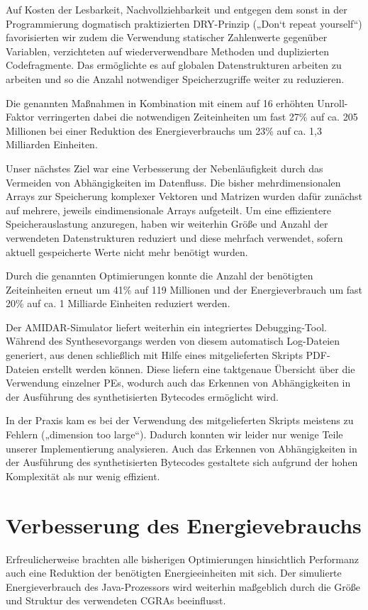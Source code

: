 \documentclass[parskip,
							 oneside,
							 11pt,
							 noheadingspace,
							 accentcolor=tud1d,
							 bigchapter,
							 colorback]{tudreport}
\begin{document}
Auf Kosten der Lesbarkeit, Nachvollziehbarkeit und entgegen dem sonst in der Programmierung dogmatisch praktizierten DRY-Prinzip („Don‘t repeat yourself“) favorisierten wir zudem die Verwendung statischer Zahlenwerte gegenüber Variablen, verzichteten auf wiederverwendbare Methoden und duplizierten Codefragmente. Das ermöglichte es auf globalen Datenstrukturen arbeiten zu arbeiten und so die Anzahl notwendiger Speicherzugriffe weiter zu reduzieren.

Die genannten Maßnahmen in Kombination mit einem auf 16 erhöhten Unroll-Faktor verringerten dabei die notwendigen Zeiteinheiten um fast 27\% auf ca. 205 Millionen bei einer Reduktion des Energieverbrauchs um 23\% auf ca. 1,3 Milliarden Einheiten. 

Unser nächstes Ziel war eine Verbesserung der Nebenläufigkeit durch das Vermeiden von Abhängigkeiten im Datenfluss. Die bisher mehrdimensionalen Arrays zur Speicherung komplexer Vektoren und Matrizen wurden dafür zunächst auf mehrere, jeweils eindimensionale Arrays aufgeteilt. Um eine effizientere Speicherauslastung anzuregen, haben wir weiterhin Größe und Anzahl der verwendeten Datenstrukturen reduziert und diese mehrfach verwendet, sofern aktuell gespeicherte Werte nicht mehr benötigt wurden.
 
Durch die genannten Optimierungen konnte die Anzahl der benötigten Zeiteinheiten erneut um 41\% auf 119 Millionen und der Energieverbrauch um fast 20\% auf ca. 1 Milliarde Einheiten reduziert werden.

Der AMIDAR-Simulator liefert weiterhin ein integriertes Debugging-Tool. Während des Synthesevorgangs werden von diesem automatisch Log-Dateien generiert, aus denen schließlich mit Hilfe eines mitgelieferten Skripts PDF-Dateien erstellt werden können. Diese liefern eine taktgenaue Übersicht über die Verwendung einzelner PEs, wodurch auch das Erkennen von Abhängigkeiten in der Ausführung des synthetisierten Bytecodes ermöglicht wird.

In der Praxis kam es bei der Verwendung des mitgelieferten Skripts meistens zu Fehlern („dimension too large“). Dadurch konnten wir leider nur wenige Teile unserer Implementierung analysieren. Auch das Erkennen von Abhängigkeiten in der Ausführung des synthetisierten Bytecodes gestaltete sich aufgrund der hohen Komplexität als nur wenig effizient.

\section{Verbesserung des Energievebrauchs}
Erfreulicherweise brachten alle bisherigen Optimierungen hinsichtlich Performanz auch eine Reduktion der benötigten Energieeinheiten mit sich. Der simulierte Energieverbrauch des Java-Prozessors wird weiterhin maßgeblich durch die Größe und Struktur des verwendeten CGRAs beeinflusst.
\end{document}
